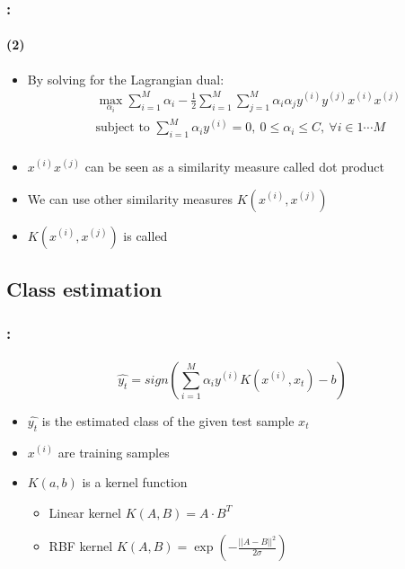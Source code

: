 \documentclass[xcolor=table]{beamer}
\begin{document}
\begin{frame}
	\frametitle{\insertshortsubtitle: \insertsection}
	\framesubtitle{\insertsubsection (2)}
	
	\begin{itemize}
		\item By solving for the Lagrangian dual:
		\begin{align*}
			& \max_{\alpha_i}  \sum\limits_{i=1}^{M} \alpha_i - \frac{1}{2} \sum\limits_{i=1}^{M} \sum\limits_{j=1}^{M} \alpha_i \alpha_j y^{(i)} y^{(j)} x^{(i)} x^{(j)} \\
			& \text{subject to } \sum\limits_{i=1}^{M} \alpha_i y^{(i)} = 0,\ 0 \le \alpha_i \le C,\ \forall i \in {1 \cdots M} \\
		\end{align*}
		\item $ x^{(i)} x^{(j)} $ can be seen as a similarity measure called dot product
		\item We can use other similarity measures $ K(x^{(i)}, x^{(j)}) $ 
		\item $ K(x^{(i)}, x^{(j)}) $ is called 
	\end{itemize}
	
\end{frame}

\subsection{Class estimation}

\begin{frame}
	\frametitle{\insertshortsubtitle: \insertsection}
	\framesubtitle{\insertsubsection}
	
	\[\hat{y_t} = sign(\sum^M_{i=1} \alpha_i y^{(i)} K(x^{(i)}, x_t) - b)\]
	\begin{itemize}
		\item $ \hat{y_t} $ is the estimated class of the given test sample $ x_t $
		\item $ x^{(i)} $ are training samples
		\item $ K(a, b) $ is a kernel function
		\begin{itemize}
			\item Linear kernel $ K(A, B) = A \cdot B^T$
			\item RBF kernel $ K(A, B) = \exp(-\frac{||A-B||^2}{2\sigma})$
		\end{itemize}
	\end{itemize}
	
\end{frame}
\end{document}
